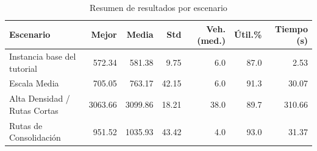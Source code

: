 \begin{table}[H]
\centering
\small
\caption{Resumen de resultados por escenario}
\begin{tabularx}{\linewidth}{>{\raggedright\arraybackslash}Xrrrrrr}
\toprule
Escenario & Mejor & Media & Std & Veh. (med.) & Útil.\% & Tiempo (s) \\
\midrule
Instancia base del tutorial & 572.34 & 581.38 & 9.75 & 6.0 & 87.0 & 2.53 \\
Escala Media & 705.05 & 763.17 & 42.15 & 6.0 & 91.3 & 30.07 \\
Alta Densidad / Rutas Cortas & 3063.66 & 3099.86 & 18.21 & 38.0 & 89.7 & 310.66 \\
Rutas de Consolidación & 951.52 & 1035.93 & 43.42 & 4.0 & 93.0 & 31.37 \\
\bottomrule
\end{tabularx}
\end{table}

